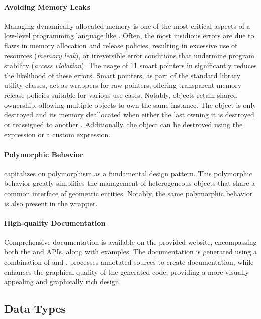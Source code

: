 \paragraph{Avoiding Memory Leaks}
Managing dynamically allocated memory is one of the most critical aspects of a low-level programming language like \cpp{}. Often, the most insidious errors are due to flaws in memory allocation and release policies, resulting in excessive use of resources (\emph{memory leak}), or irreversible error conditions that undermine program stability (\emph{access violation}). The usage of \cpp{}11 smart pointers in \Acme{} significantly reduces the likelihood of these errors. Smart pointers, as part of the standard library utility classes, act as wrappers for raw pointers, offering transparent memory release policies suitable for various use cases. Notably, \SharedPointer{} objects retain shared ownership, allowing multiple objects to own the same instance. The object is only destroyed and its memory deallocated when either the last \SharedPointer{} owning it is destroyed or reassigned to another \SharedPointer{}. Additionally, the object can be destroyed using the  expression or a custom  expression.

\paragraph{Polymorphic Behavior}
\Acme{} capitalizes on \cpp{} polymorphism as a fundamental design pattern. This polymorphic behavior greatly simplifies the management of heterogeneous objects that share a common interface of geometric entities. Notably, the same \cpp{} polymorphic behavior is also present in the \Matlab{} \Mex{} wrapper.

\paragraph{High-quality Documentation}
Comprehensive documentation is available on the provided website, encompassing both the \cpp{} and \Matlab{} \Mex{} \acp{API}, along with examples. The documentation is generated using a combination of \Doxygen{} and \Sphinx{}. \Doxygen{} processes annotated \cpp{} sources to create documentation, while \Sphinx{} enhances the graphical quality of the generated \html{} code, providing a more visually appealing and graphically rich design.

\subsection{Data Types}

